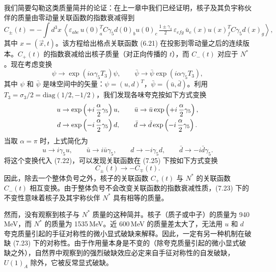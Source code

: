 我们简要勾勒这类质量简并的论证：在上一章中我们已经证明，核子及其负宇称伙伴的质量由零动量关联函数的指数衰减得到
\begin{equation}
  C_\pm(t) = -\int d^3x\,
  \left\langle
    \varepsilon_{abc}\,u(0)^T_a C\gamma_5 d(0)_b u(0)_c\,
    \tfrac{1\pm\gamma_4}{2}\,
    \varepsilon_{efg}\,\bar{u}_e(x) u(x)^T_f C\gamma_5 d(x)_g
  \right\rangle,
\end{equation}
其中 $x = (\vec{x}, t)$。该方程给出格点关联函数 (6.21) 在投影到零动量之后的连续版本。$C_+(t)$ 的指数衰减给出核子质量（对正向传播的 $t$），而 $C_-(t)$ 对应于 $N^*$。现在考虑变换
\begin{equation}
  \psi \to \exp\left(i\alpha\gamma_5 T_3\right)\psi,
  \qquad
  \bar\psi \to \bar\psi\exp\left(i\alpha\gamma_5 T_3\right),
\end{equation}
其中 $\psi$ 和 $\bar\psi$ 是味空间中的矢量：$\psi = (u, d)^T$，$\bar\psi = (\bar{u}, \bar{d})$。利用 $T_3 = \sigma_3/2 = \mathrm{diag}(1/2, -1/2)$，我们发现各味夸克按如下方式变换
\begin{align}
  u &\to \exp\left(+i\,\frac{\alpha}{2}\gamma_5\right)u, \qquad
  \bar{u} \to \bar{u}\exp\left(+i\,\frac{\alpha}{2}\gamma_5\right), \notag\\
  d &\to \exp\left(-i\,\frac{\alpha}{2}\gamma_5\right)d, \qquad
  \bar{d} \to \bar{d}\exp\left(-i\,\frac{\alpha}{2}\gamma_5\right).
\end{align}
当取 $\alpha = \pi$ 时，上式简化为
\begin{equation}
  u \to i\gamma_5 u, \qquad
  \bar{u} \to i\bar{u}\gamma_5, \qquad
  d \to -i\gamma_5 d, \qquad
  \bar{d} \to -i\bar{d}\gamma_5 .
\end{equation}
将这个变换代入 (7.22)，可以发现关联函数在 (7.25) 下按如下方式变换
\begin{equation}
  C_\pm(t) \to -C_\mp(t) .
\end{equation}
因此，除去一个整体负号之外，核子的关联函数 $C_+(t)$ 与 $N^*$ 的关联函数 $C_-(t)$ 相互变换。由于整体负号不会改变关联函数的指数衰减性质，(7.23) 下的不变性意味着核子及其宇称伙伴 $N^*$ 具有相等的质量。

然而，没有观察到核子与 $N^*$ 质量的这种简并。核子（质子或中子）的质量为 940\,MeV，而 $N^*$ 的质量为 1535\,MeV。近 600\,MeV 的质量差太大了，无法用 $u$ 和 $d$ 夸克质量引起的手征对称性的微小显式破缺来解释。因此，一定有另一种机制在破缺 (7.23) 下的对称性。由于作用量本身是不变的（除夸克质量引起的微小显式破缺之外），自然界中观察到的强烈破缺效应必定来自手征对称性的自发破缺，$U(1)_A$ 除外，它被反常显式破缺。

